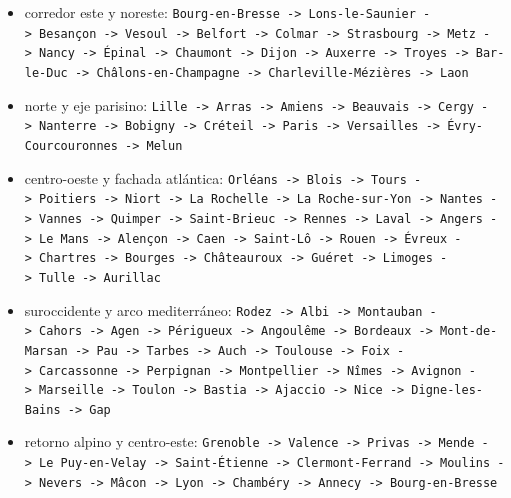 \documentclass[
  12pt,
  letterpaper,
  DIV=11,
  numbers=noendperiod]{scrartcl}
\providecommand{\tightlist}{%
  \setlength{\itemsep}{0pt}\setlength{\parskip}{0pt}}
\begin{document}
\begin{itemize}
\tightlist
\item
  corredor este y noreste:
  \texttt{Bourg-en-Bresse\ -\textgreater{}\ Lons-le-Saunier\ -\textgreater{}\ Besançon\ -\textgreater{}\ Vesoul\ -\textgreater{}\ Belfort\ -\textgreater{}\ Colmar\ -\textgreater{}\ Strasbourg\ -\textgreater{}\ Metz\ -\textgreater{}\ Nancy\ -\textgreater{}\ Épinal\ -\textgreater{}\ Chaumont\ -\textgreater{}\ Dijon\ -\textgreater{}\ Auxerre\ -\textgreater{}\ Troyes\ -\textgreater{}\ Bar-le-Duc\ -\textgreater{}\ Châlons-en-Champagne\ -\textgreater{}\ Charleville-Mézières\ -\textgreater{}\ Laon}
\item
  norte y eje parisino:
  \texttt{Lille\ -\textgreater{}\ Arras\ -\textgreater{}\ Amiens\ -\textgreater{}\ Beauvais\ -\textgreater{}\ Cergy\ -\textgreater{}\ Nanterre\ -\textgreater{}\ Bobigny\ -\textgreater{}\ Créteil\ -\textgreater{}\ Paris\ -\textgreater{}\ Versailles\ -\textgreater{}\ Évry-Courcouronnes\ -\textgreater{}\ Melun}
\item
  centro-oeste y fachada atlántica:
  \texttt{Orléans\ -\textgreater{}\ Blois\ -\textgreater{}\ Tours\ -\textgreater{}\ Poitiers\ -\textgreater{}\ Niort\ -\textgreater{}\ La\ Rochelle\ -\textgreater{}\ La\ Roche-sur-Yon\ -\textgreater{}\ Nantes\ -\textgreater{}\ Vannes\ -\textgreater{}\ Quimper\ -\textgreater{}\ Saint-Brieuc\ -\textgreater{}\ Rennes\ -\textgreater{}\ Laval\ -\textgreater{}\ Angers\ -\textgreater{}\ Le\ Mans\ -\textgreater{}\ Alençon\ -\textgreater{}\ Caen\ -\textgreater{}\ Saint-Lô\ -\textgreater{}\ Rouen\ -\textgreater{}\ Évreux\ -\textgreater{}\ Chartres\ -\textgreater{}\ Bourges\ -\textgreater{}\ Châteauroux\ -\textgreater{}\ Guéret\ -\textgreater{}\ Limoges\ -\textgreater{}\ Tulle\ -\textgreater{}\ Aurillac}
\item
  suroccidente y arco mediterráneo:
  \texttt{Rodez\ -\textgreater{}\ Albi\ -\textgreater{}\ Montauban\ -\textgreater{}\ Cahors\ -\textgreater{}\ Agen\ -\textgreater{}\ Périgueux\ -\textgreater{}\ Angoulême\ -\textgreater{}\ Bordeaux\ -\textgreater{}\ Mont-de-Marsan\ -\textgreater{}\ Pau\ -\textgreater{}\ Tarbes\ -\textgreater{}\ Auch\ -\textgreater{}\ Toulouse\ -\textgreater{}\ Foix\ -\textgreater{}\ Carcassonne\ -\textgreater{}\ Perpignan\ -\textgreater{}\ Montpellier\ -\textgreater{}\ Nîmes\ -\textgreater{}\ Avignon\ -\textgreater{}\ Marseille\ -\textgreater{}\ Toulon\ -\textgreater{}\ Bastia\ -\textgreater{}\ Ajaccio\ -\textgreater{}\ Nice\ -\textgreater{}\ Digne-les-Bains\ -\textgreater{}\ Gap}
\item
  retorno alpino y centro-este:
  \texttt{Grenoble\ -\textgreater{}\ Valence\ -\textgreater{}\ Privas\ -\textgreater{}\ Mende\ -\textgreater{}\ Le\ Puy-en-Velay\ -\textgreater{}\ Saint-Étienne\ -\textgreater{}\ Clermont-Ferrand\ -\textgreater{}\ Moulins\ -\textgreater{}\ Nevers\ -\textgreater{}\ Mâcon\ -\textgreater{}\ Lyon\ -\textgreater{}\ Chambéry\ -\textgreater{}\ Annecy\ -\textgreater{}\ Bourg-en-Bresse}
\end{itemize}
\end{document}
